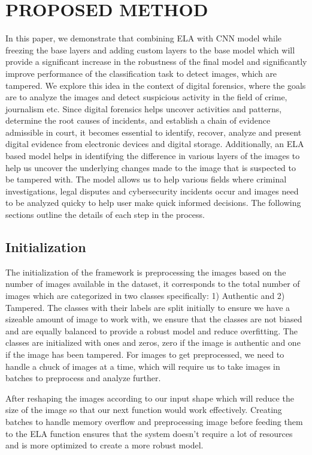 \documentclass{ieeeaccess}
\begin{document}
\section{PROPOSED METHOD}

In this paper, we demonstrate that combining ELA with CNN model while freezing the base layers and adding custom layers to the base model which will provide a significant increase in the robustness of the final model and significantly improve performance of the classification task to detect images, which are tampered. We explore this idea in the context of digital forensics, where the goals are to analyze the images and detect suspicious activity in the field of crime, journalism etc. Since digital forensics helps uncover activities and patterns, determine the root causes of incidents, and establish a chain of evidence admissible in court, it becomes essential to identify, recover, analyze and present digital evidence from electronic devices and digital storage. Additionally, an ELA based model helps in identifying the difference in various layers of the images to help us uncover the underlying changes made to the image that is suspected to be tampered with. The model allows us to help various fields where criminal investigations, legal disputes and cybersecurity incidents occur and images need to be analyzed quicky to help user make quick informed decisions. The following sections outline the details of each step in the process.

\subsection{Initialization}

The initialization of the framework is preprocessing the images based on the number of images available in the dataset, it corresponds to the total number of images which are categorized in two classes specifically: 1) Authentic and 2) Tampered. The classes with their labels are split initially to ensure we have a sizeable amount of image to work with, we ensure that the classes are not biased and are equally balanced to provide a robust model and reduce overfitting. The classes are initialized with ones and zeros, zero if the image is authentic and one if the image has been tampered. For images to get preprocessed, we need to handle a chuck of images at a time, which will require us to take images in batches to preprocess and analyze further. 

After reshaping the images according to our input shape which will reduce the size of the image so that our next function would work effectively. Creating batches to handle memory overflow and preprocessing image before feeding them to the ELA function ensures that the system doesn’t require a lot of resources and is more optimized to create a more robust model.
\end{document}
